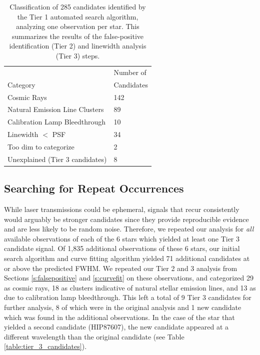 \documentclass[twocolumn]{aastex701}
\begin{document}
\begin{table}
\begin{center}
\begin{tabular}{|l|l|} 
 \hline
 & Number of \\
 Category & Candidates \\ 
 \hline
 Cosmic Rays & 142 \\ 
 Natural Emission Line Clusters & 89 \\ 
 Calibration Lamp Bleedthrough &  10 \\ 
 Linewidth $<$ PSF & 34 \\
 Too dim to categorize & 2 \\
 Unexplained (Tier 3 candidates) & 8 \\
 \hline
 \end{tabular}
\end{center}
\caption{Classification of 285 candidates identified by the Tier 1 automated search algorithm, analyzing one observation per star.  This summarizes the results of the false-positive identification (Tier 2) and linewidth analysis (Tier 3) steps.}
\label{table:classification}
\end{table}

\subsection{Searching for Repeat Occurrences}
\label{s:repeat}
While laser transmissions could be ephemeral, signals that recur consistently would arguably be stronger candidates since they provide reproducible evidence and are less likely to be random noise.  Therefore, we repeated our analysis for {\em all} available observations of each of the 6 stars which yielded at least one Tier 3 candidate signal. Of 1,835 additional observations of these 6 stars, our initial search algorithm and curve fitting algorithm yielded 71 additional candidates at or above the predicted FWHM. We repeated our Tier 2 and 3 analysis from Sections \ref{s:falsepositive} and \ref{s:curvefit} on these observations, and categorized 29 as cosmic rays, 18 as clusters indicative of natural stellar emission lines, and 13 as due to calibration lamp bleedthrough. This left a total of 9 Tier 3 candidates for further analysis, 8 of which were in the original analysis and 1 new candidate which was found in the additional observations. In the case of the star that yielded a second candidate (HIP87607), the new candidate appeared at a different wavelength than the original candidate (see Table \ref{table:tier_3_candidates}).
\end{document}
